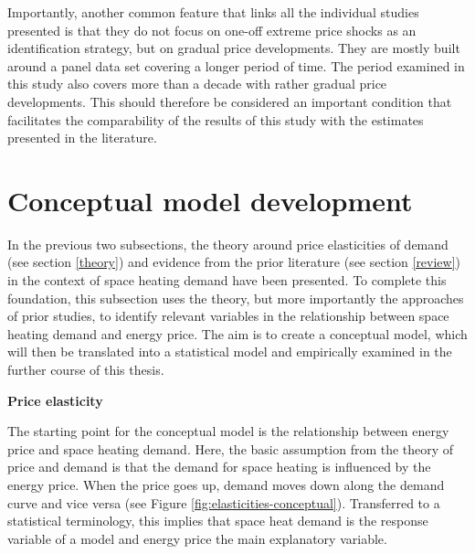 \documentclass[12pt,twoside]{reedthesis}
\begin{document}
Importantly, another common feature that links all the individual studies presented is that they do not focus on one-off extreme price shocks as an identification strategy, but on gradual price developments. They are mostly built around a panel data set covering a longer period of time. The period examined in this study also covers more than a decade with rather gradual price developments. This should therefore be considered an important condition that facilitates the comparability of the results of this study with the estimates presented in the literature.

\hypertarget{conceptual-model}{%
\section{Conceptual model development}\label{conceptual-model}}

In the previous two subsections, the theory around price elasticities of demand (see section \ref{theory}) and evidence from the prior literature (see section \ref{review}) in the context of space heating demand have been presented. To complete this foundation, this subsection uses the theory, but more importantly the approaches of prior studies, to identify relevant variables in the relationship between space heating demand and energy price. The aim is to create a conceptual model, which will then be translated into a statistical model and empirically examined in the further course of this thesis.

\textbf{Price elasticity}

The starting point for the conceptual model is the relationship between energy price and space heating demand. Here, the basic assumption from the theory of price and demand is that the demand for space heating is influenced by the energy price. When the price goes up, demand moves down along the demand curve and vice versa (see Figure \ref{fig:elasticities-conceptual}). Transferred to a statistical terminology, this implies that space heat demand is the response variable of a model and energy price the main explanatory variable.
\end{document}

